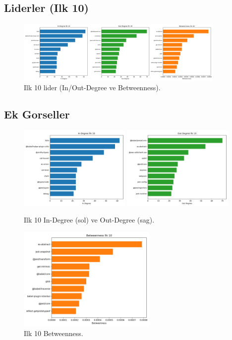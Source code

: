 \documentclass[11pt,a4paper]{article}
\begin{document}
\subsection{Liderler (Ilk 10)}
\begin{figure}[h]
  \centering
  \includegraphics[width=0.90\textwidth]{top10_leaders.png}
  \caption{Ilk 10 lider (In/Out-Degree ve Betweenness).}
\end{figure}

\subsection{Ek Gorseller}
\begin{figure}[h]
  \centering
  \includegraphics[width=0.48\textwidth]{top10_in_degree.png}
  \includegraphics[width=0.48\textwidth]{top10_out_degree.png}
  \caption{Ilk 10 In-Degree (sol) ve Out-Degree (sag).}
\end{figure}

\begin{figure}[h]
  \centering
  \includegraphics[width=0.6\textwidth]{top10_betweenness.png}
  \caption{Ilk 10 Betweenness.}
\end{figure}
\end{document}
